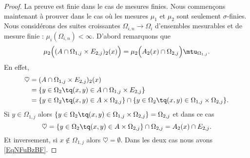 \begin{proof}
		La preuve est finie dans le cas de mesures finies. Nous commençons maintenant à prouver dans le cas où les mesures \( \mu_1\) et \( \mu_2\) sont seulement \( \sigma\)-finies. Nous considérons des suites croissantes \( \Omega_{i,n}\to\Omega_i\) d'ensembles mesurables et de mesure finie : \( \mu_i(\Omega_{i,n})<\infty\). D'abord remarquons que
		\begin{equation}\label{EqNFuBzBF}
		\mu_2\Big( (A\cap \Omega_{1,j}\times E_{2,j})_2(x) \Big)=\mu_2\Big( A_2(x)\cap \Omega_{2,j} \Big)\mtu_{\Omega_{1,j}}.
		\end{equation}
		En effet,
		\begin{subequations}
		\begin{align}
		\heartsuit & =(A\cap\Omega_{1,j}\times E_{2,j})_2(x)                                                                                  \\
									& =\{ y\in\Omega_2\tq (x,y)\in A\cap \Omega_{1,j}\times E_{2,j} \}                                                         \\
									& =\{ y\in \Omega_2\tq (x,y)\in A\times \Omega_{2,j} \}\cap\{ y\in\Omega_2\tq (x,y)\in \Omega_{1,j}\times \Omega_{2,j} \}.
									\end{align}
									\end{subequations}
									Si \( y\in \Omega_{1,j}\) alors \( \{ y\in \Omega_2\tq (x,y)\in \Omega_{1,j}\times \Omega_{2,j} \}=\Omega_{2,j}\) et dans ce cas
									\begin{equation}
									\heartsuit=\{ y\in \Omega_2\tq (x,y)\in A\times \Omega_{2,j} \}\cap \Omega_{2,j}=A_2(x)\cap E_{2,j}.
									\end{equation}
									Et inversement, si \( x\notin \Omega_{1,j}\) alors \( \heartsuit=\emptyset\). Dans les deux cas nous avons \eqref{EqNFuBzBF}.


\end{proof}
